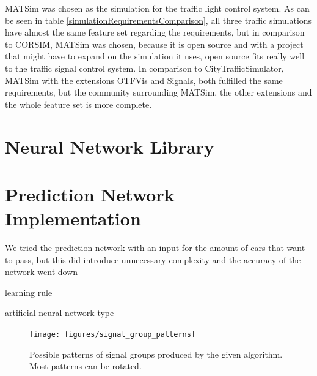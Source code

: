 MATSim was chosen as the simulation for the traffic light control system. As can be seen in table \ref{simulationRequirementsComparison}, all three traffic simulations have almost the same feature set regarding the requirements, but in comparison to CORSIM, MATSim was chosen, because it is open source and with a project that might have to expand on the simulation it uses, open source fits really well to the traffic signal control system. In comparison to CityTrafficSimulator, MATSim with the extensions OTFVis and Signals, both fulfilled the same requirements, but the community surrounding MATSim, the other extensions and the whole feature set is more complete.

\section{Neural Network Library}

\section{Prediction Network Implementation}

We tried the prediction network with an input for the amount of cars that want to pass, but this did introduce unnecessary complexity and the accuracy of the network went down

learning rule

artificial neural network type



\begin{figure}[ht]
	\centering
	\texttt{[image: figures/signal\_group\_patterns]}
	\caption{Possible patterns of signal groups produced by the given algorithm. Most patterns can be rotated.}
	\label{signal_group_pattern}
\end{figure}